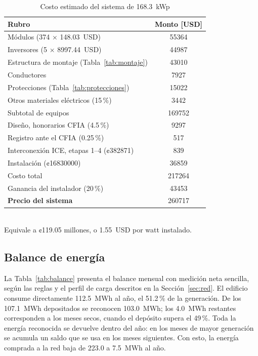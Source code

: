 \begin{table}[!htb]
\caption{Costo estimado del sistema de \SI{168.3}{kWp}}
\label{tab:costos}
\centering
\footnotesize
\setlength{\tabcolsep}{4pt}
\begin{tabular}{l S[table-format=6.0]}
\toprule
{Rubro} & {Monto [USD]} \\
\midrule
Módulos (374 $\times$ \SI{148.03}{USD}) & 55364 \\
Inversores (5 $\times$ \SI{8997.44}{USD}) & 44987 \\
Estructura de montaje (Tabla~\ref{tab:montaje}) & 43010 \\
Conductores & 7927 \\
Protecciones (Tabla~\ref{tab:protecciones}) & 15022 \\
Otros materiales eléctricos (15\,\%) & 3442 \\
\midrule
Subtotal de equipos & 169752 \\
\midrule
Diseño, honorarios CFIA (4.5\,\%) & 9297 \\
Registro ante el CFIA (0.25\,\%) & 517 \\
Interconexión ICE, etapas 1--4 (¢\num{382871}) & 839 \\
Instalación (¢\num{16830000}) & 36859 \\
\midrule
Costo total & 217264 \\
Ganancia del instalador (20\,\%) & 43453 \\
\midrule
\textbf{Precio del sistema} & 260717 \\
\bottomrule
\end{tabular}
\\[2pt]
{\footnotesize Equivale a ¢119.05 millones, o \SI{1.55}{USD} por watt instalado.}
\end{table}

\subsection{Balance de energía}

La Tabla~\ref{tab:balance} presenta el balance mensual con medición neta sencilla, según las reglas y el perfil de carga descritos en la Sección~\ref{sec:red}. El edificio consume directamente \SI{112.5}{MWh} al año, el 51.2\,\% de la generación. De los \SI{107.1}{MWh} depositados se reconocen \SI{103.0}{MWh}; los \SI{4.0}{MWh} restantes corresponden a los meses secos, cuando el depósito supera el 49\,\%. Toda la energía reconocida se devuelve dentro del año: en los meses de mayor generación se acumula un saldo que se usa en los meses siguientes. Con esto, la energía comprada a la red baja de 223.0 a \SI{7.5}{MWh} al año.


